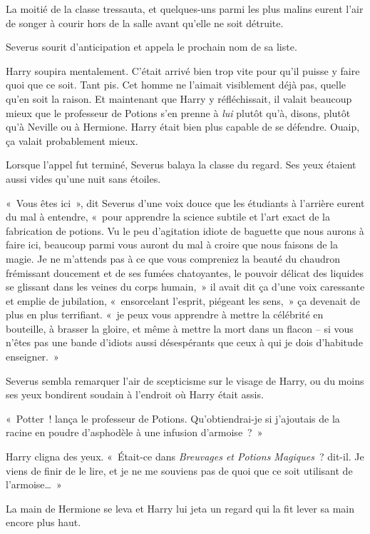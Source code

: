 La moitié de la classe tressauta, et quelques-uns parmi les plus malins eurent l'air de songer à courir hors de la salle avant qu'elle ne soit détruite.

Severus sourit d'anticipation et appela le prochain nom de sa liste.

Harry soupira mentalement. C'était arrivé bien trop vite pour qu'il puisse y faire quoi que ce soit. Tant pis. Cet homme ne l'aimait visiblement déjà pas, quelle qu'en soit la raison. Et maintenant que Harry y réfléchissait, il valait beaucoup mieux que le professeur de Potions s'en prenne à \emph{lui} plutôt qu'à, disons, plutôt qu'à Neville ou à Hermione. Harry était bien plus capable de se défendre. Ouaip, ça valait probablement mieux.

Lorsque l'appel fut terminé, Severus balaya la classe du regard. Ses yeux étaient aussi vides qu'une nuit sans étoiles.

«~Vous êtes ici~», dit Severus d'une voix douce que les étudiants à l'arrière eurent du mal à entendre, «~pour apprendre la science subtile et l'art exact de la fabrication de potions. Vu le peu d'agitation idiote de baguette que nous aurons à faire ici, beaucoup parmi vous auront du mal à croire que nous faisons de la magie. Je ne m'attends pas à ce que vous compreniez la beauté du chaudron frémissant doucement et de ses fumées chatoyantes, le pouvoir délicat des liquides se glissant dans les veines du corps humain,~» il avait dit ça d'une voix caressante et emplie de jubilation, «~ensorcelant l'esprit, piégeant les sens,~» ça devenait de plus en plus terrifiant. «~je peux vous apprendre à mettre la célébrité en bouteille, à brasser la gloire, et même à mettre la mort dans un flacon -- si vous n'êtes pas une bande d'idiots aussi désespérants que ceux à qui je dois d'habitude enseigner.~»

Severus sembla remarquer l'air de scepticisme sur le visage de Harry, ou du moins ses yeux bondirent soudain à l'endroit où Harry était assis.

«~Potter~! lança le professeur de Potions. Qu'obtiendrai-je si j'ajoutais de la racine en poudre d'asphodèle à une infusion d'armoise~?~»

Harry cligna des yeux. «~Était-ce dans \emph{Breuvages et Potions Magiques}~? dit-il. Je viens de finir de le lire, et je ne me souviens pas de quoi que ce soit utilisant de l'armoise…~»

La main de Hermione se leva et Harry lui jeta un regard qui la fit lever sa main encore plus haut.


